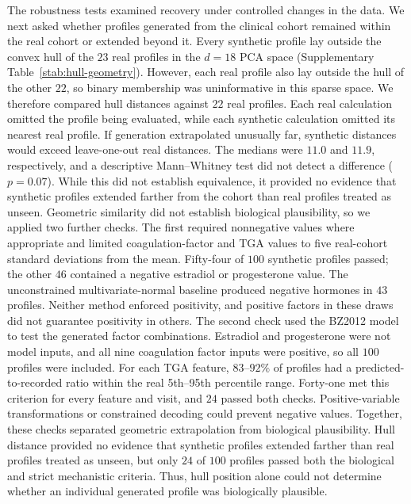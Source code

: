 The robustness tests examined recovery under controlled changes in the data. We next
asked whether profiles generated from the clinical cohort remained within the real cohort or
extended beyond it. Every synthetic profile lay outside the convex hull of the $23$ real profiles in the
$d{=}18$ PCA space (Supplementary Table~\ref{stab:hull-geometry}). However, each real profile
also lay outside the hull of the other $22$, so binary membership was uninformative in this
sparse space. We therefore compared hull distances against $22$ real profiles. Each real
calculation omitted the profile being evaluated, while each synthetic calculation omitted its
nearest real profile. If generation extrapolated unusually far, synthetic distances would
exceed leave-one-out real distances. The medians were $11.0$ and $11.9$, respectively, and a
descriptive Mann--Whitney test did not detect a difference ($p{=}0.07$). While this did not establish
equivalence, it provided no evidence that synthetic profiles extended farther from the
cohort than real profiles treated as unseen. Geometric similarity did not establish biological
plausibility, so we applied two further checks. The first required nonnegative values where
appropriate and limited coagulation-factor and TGA values to five real-cohort standard
deviations from the mean. Fifty-four of $100$ synthetic
profiles passed; the other $46$ contained a negative estradiol or progesterone value. The
unconstrained multivariate-normal baseline produced negative hormones in $43$ profiles.
Neither method enforced positivity, and positive factors in these draws did not guarantee
positivity in others. The second check used the BZ2012 model to test the generated factor combinations.
Estradiol and progesterone were not model inputs, and all nine coagulation factor inputs were positive, so
all $100$ profiles were included. For each TGA feature, $83$--$92\%$ of profiles had a
predicted-to-recorded ratio within the real 5th--95th percentile range. Forty-one met this
criterion for every feature and visit, and $24$ passed both checks. Positive-variable
transformations or constrained decoding could prevent negative values. Together, these checks
separated geometric extrapolation from biological plausibility. Hull distance provided no
evidence that synthetic profiles extended farther than real profiles treated as unseen, but
only $24$ of $100$ profiles passed both the biological and strict mechanistic criteria. Thus,
hull position alone could not determine whether an individual generated profile was
biologically plausible.

